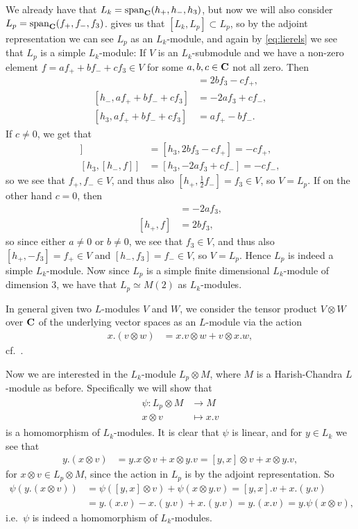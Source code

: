 We already have that $L_k=\operatorname{span}_{\mathbf{C}}(h_+,h_-,h_3)$, but now we will also consider $L_p=\operatorname{span}_{\mathbf{C}}(f_+,f_-,f_3)$.  gives us that $[L_k,L_p]\subset L_p$, so by the adjoint representation we can see $L_p$ as an $L_k$-module, and again by \cref{eq:lierels} we see that $L_p$ is a simple $L_k$-module: If $V$ is an $L_k$-submodule and we have a non-zero element $f=af_++bf_-+cf_3\in V$ for some $a,b,c\in\mathbf{C}$ not all zero. Then
\begin{align*}
  [h_+,af_++bf_-+cf_3] &= 2bf_3-cf_+, \\
  [h_-,af_++bf_-+cf_3] &= -2af_3+cf_-, \\
  [h_3,af_++bf_-+cf_3] &= af_+-bf_-.
\end{align*}
If $c\neq0$, we get that
\begin{align*}
  [h_3,[h_+,f]] &= [h_3,2bf_3-cf_+] = -cf_+, \\
  [h_3,[h_-,f]] &= [h_3,-2af_3+cf_-] = -cf_-,
\end{align*}
so we see that $f_+,f_-\in V$, and thus also $[h_+,\tfrac{1}{2}f_-]=f_3\in V$, so $V=L_p$. If on the other hand $c=0$, then
\begin{align*}
  [h_-,f] &= -2af_3, \\
  [h_+,f] &= 2bf_3,
\end{align*}
so since either $a\neq 0$ or $b\neq 0$, we see that $f_3\in V$, and thus also $[h_+,-f_3]=f_+\in V$ and $[h_-,f_3]=f_-\in V$, so $V=L_p$. Hence $L_p$ is indeed a simple $L_k$-module. Now since $L_p$ is a simple finite dimensional $L_k$-module of dimension 3, we have that $L_p\simeq M(2)$ as $L_k$-modules.

In general given two $L$-modules $V$ and $W$, we consider the tensor product $V\otimes W$ over $\mathbf{C}$ of the underlying vector spaces as an $L$-module via the action
\begin{align*}
  x.(v\otimes w) &= x.v\otimes w + v\otimes x.w,
\end{align*}
cf.\ \cite[26]{humphrey}.

Now we are interested in the $L_k$-module $L_p\otimes M$, where $M$ is a Harish-Chandra $L$-module as before. Specifically we will show that
\begin{align}
  \begin{split} \label{eq:psi}
    \psi \colon L_p\otimes M &\to M \\
    x\otimes v &\mapsto x.v
  \end{split}
\end{align}
is a homomorphism of $L_k$-modules. It is clear that $\psi$ is linear, and for $y\in L_k$ we see that
\begin{align*}
  y.(x\otimes v) &= y.x\otimes v + x\otimes y.v = [y,x]\otimes v + x\otimes y.v,
\end{align*}
for $x\otimes v\in L_p\otimes M$, since the action in $L_p$ is by the adjoint representation. So
\begin{align*}
  \psi(y.(x\otimes v)) &= \psi([y,x]\otimes v) + \psi(x\otimes y.v) = [y,x].v + x.(y.v) \\
  &= y.(x.v)-x.(y.v)+x.(y.v) = y.(x.v) = y.\psi(x\otimes v),
\end{align*}
i.e.\ $\psi$ is indeed a homomorphism of $L_k$-modules.

